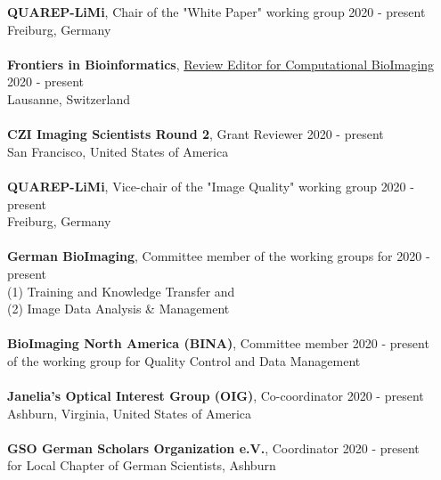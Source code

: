 \documentclass[margin,line]{res}
\begin{document}
\begin{resume}
{\bf QUAREP-LiMi}, Chair of the "White Paper" working group \hfill {2020 - present}\\
Freiburg, Germany\\
\vspace*{-3mm}\\
{\bf Frontiers in Bioinformatics},  \href{https://www.frontiersin.org/journals/bioinformatics/sections/computational-bioimaging}{Review Editor for Computational BioImaging} \hfill {2020 - present}\\
Lausanne, Switzerland\\
\vspace*{-3mm}\\
{\bf CZI Imaging Scientists Round 2}, Grant Reviewer \hfill {2020 - present}\\
San Francisco, United States of America\\
\vspace*{-3mm}\\
{\bf QUAREP-LiMi}, Vice-chair of the "Image Quality" working group  \hfill {2020 - present}\\
Freiburg, Germany\\
\vspace*{-3mm}\\
{\bf German BioImaging}, Committee member of the working groups for \hfill {2020 - present}\\
 (1)  Training and Knowledge Transfer and\\
(2) Image Data Analysis \& Management\\
\vspace*{-3mm}\\
{\bf BioImaging North America (BINA)}, Committee member \hfill {2020 - present}\\
of the working group for Quality Control and Data Management\\
\vspace*{-3mm}\\
{\bf Janelia's Optical Interest Group (OIG)}, Co-coordinator \hfill {2020 - present}\\
Ashburn, Virginia, United States of America\\
\vspace*{-3mm}\\
{\bf GSO German Scholars Organization e.V.}, Coordinator  \hfill {2020 - present}\\
for Local Chapter of German Scientists, Ashburn\\
\vspace*{-3mm}\\

\end{resume}
\end{document}
